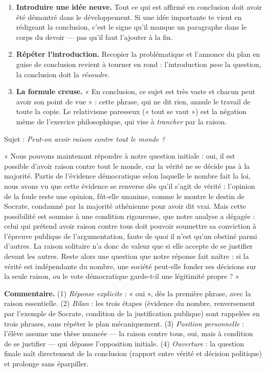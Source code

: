 \documentclass[11pt]{article}
\newcounter{popsec}
\newcounter{popsub}
\newcommand{\courssub}[1]{%
  \stepcounter{popsub}%
  \par\vspace{9pt}\noindent{\popxbold\fontsize{11.5}{13}\selectfont\color{popink}{\color{poporange}\thepopsec.\thepopsub}\hspace{6pt}#1}\par\nopagebreak\vspace{4pt}
}
\begin{document}
\begin{attention}
\begin{enumerate}
\item \textbf{Introduire une idée neuve.} Tout ce qui est affirmé en conclusion doit avoir été démontré dans le développement. Si une idée importante te vient en rédigeant la conclusion, c'est le signe qu'il manque un paragraphe dans le corps du devoir — pas qu'il faut l'ajouter à la fin.
\item \textbf{Répéter l'introduction.} Recopier la problématique et l'annonce du plan en guise de conclusion revient à tourner en rond : l'introduction \emph{pose} la question, la conclusion doit la \emph{résoudre}.
\item \textbf{La formule creuse.} « En conclusion, ce sujet est très vaste et chacun peut avoir son point de vue » : cette phrase, qui ne dit rien, annule le travail de toute la copie. Le relativisme paresseux (« tout se vaut ») est la négation même de l'exercice philosophique, qui vise à \emph{trancher} par la raison.
\end{enumerate}
\end{attention}

\courssub{Exemple commenté et entraînement}

\begin{exemplebox}
Sujet : \emph{Peut-on avoir raison contre tout le monde ?}

\medskip
« Nous pouvons maintenant répondre à notre question initiale : oui, il est possible d'avoir raison contre tout le monde, car la vérité ne se décide pas à la majorité. Partis de l'évidence démocratique selon laquelle le nombre fait la loi, nous avons vu que cette évidence se renverse dès qu'il s'agit de vérité : l'opinion de la foule reste une opinion, fût-elle unanime, comme le montre le destin de Socrate, condamné par la majorité athénienne pour avoir dit vrai. Mais cette possibilité est soumise à une condition rigoureuse, que notre analyse a dégagée : celui qui prétend avoir raison contre tous doit pouvoir soumettre sa conviction à l'épreuve publique de l'argumentation, faute de quoi il n'est qu'un obstiné parmi d'autres. La raison solitaire n'a donc de valeur que si elle accepte de se justifier devant les autres. Reste alors une question que notre réponse fait naître : si la vérité est indépendante du nombre, une société peut-elle fonder ses décisions sur la seule raison, ou le vote démocratique garde-t-il une légitimité propre ? »

\medskip
\textbf{Commentaire.} (1) \emph{Réponse explicite} : « oui », dès la première phrase, avec la raison essentielle. (2) \emph{Bilan} : les trois étapes (évidence du nombre, renversement par l'exemple de Socrate, condition de la justification publique) sont rappelées en trois phrases, sans répéter le plan mécaniquement. (3) \emph{Position personnelle} : l'élève assume une thèse nuancée — la raison contre tous, oui, mais à condition de se justifier — qui dépasse l'opposition initiale. (4) \emph{Ouverture} : la question finale naît directement de la conclusion (rapport entre vérité et décision politique) et prolonge sans éparpiller.
\end{exemplebox}
\end{document}
